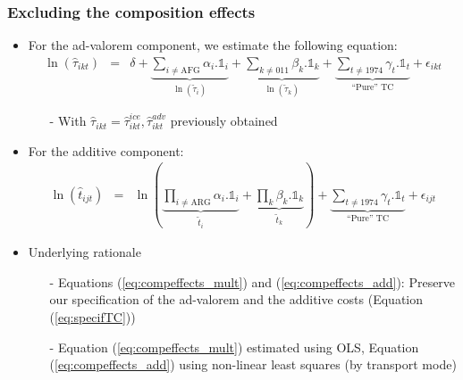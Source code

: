 \documentclass[10 pt,Helvetica, french]{beamer}
\begin{document}
\begin{frame}
\frametitle{Excluding the composition effects}
\begin{itemize}
\item For the ad-valorem component, we estimate the following equation:
\footnotesize
\begin{eqnarray}
\ln(\widehat{\tau}_{ikt})&=&\delta +\underbrace{\sum_{i \neq \text{AFG}}\alpha_i.\mathbb{1}_i }_{\ln(\widetilde{\tau}_i)}+ \underbrace{\sum_{k\neq \text{011}}\beta_k.\mathbb{1}_k }_{\ln(\widetilde{\tau}_k)}+ \underbrace{\sum_{t \neq 1974}\gamma_t.\mathbb{1}_t}_{\text{``Pure'' TC}}+\epsilon_{ikt} \label{eq:compeffects_mult}
\end{eqnarray}
\normalsize
\begin{itemize}
\item[-] With $\widehat{\tau}_{ikt} = \widehat{\tau}^{ice}_{ikt}, \widehat{\tau}^{adv}_{ikt}$ previously obtained  \vspace{0.1cm}
\end{itemize}
\item For the additive component:
\footnotesize
\begin{eqnarray}
\ln(\widehat{t}_{ijt})&=&\ln\left( \underbrace{\prod_{i \neq \text{ARG}}  \alpha_i.\mathbb{1}_i}_{\widetilde{t}_i}+ \underbrace{\prod_{k}\beta_k.\mathbb{1}_k}_{\widetilde{t}_k}\right) + \underbrace{\sum_{t \neq 1974}\gamma_t.\mathbb{1}_t}_{\text{``Pure'' TC}}+\epsilon_{ijt} \label{eq:compeffects_add}
\end{eqnarray}
\normalsize
\item Underlying rationale
\footnotesize
\begin{itemize}
\item[-] Equations (\ref{eq:compeffects_mult}) and (\ref{eq:compeffects_add}): Preserve our specification of the ad-valorem and the additive costs (Equation (\ref{eq:specifTC})) \vspace{0.1cm}
\item[-] Equation (\ref{eq:compeffects_mult}) estimated using OLS, Equation (\ref{eq:compeffects_add}) using non-linear least squares (by transport mode)
    \normalsize
\end{itemize}
\end{itemize}
\end{frame}
\end{document}
